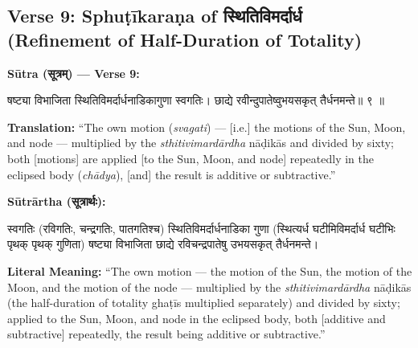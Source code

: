 \documentclass[11pt,a4paper]{article}
\newcommand{\dev}[1]{{\devanagarifont #1}}
\newenvironment{sanskritverse}{%
  \begin{center}\begin{minipage}{0.95\textwidth}
  \setlength{\leftskip}{1em}
  \setlength{\rightskip}{1em}
  \dev
}{\end{minipage}\end{center}}
\newenvironment{paracol}[1]{\begingroup}{\endgroup}
\newcommand{\switchcolumn}[1][]{%
  \ifnum#1=0\relax\else\par\nobreak\vspace{0.5em}\par\nobreak\fi%
}
\begin{document}
\subsection{Verse 9: Sphuṭīkaraṇa of \texorpdfstring{{\devanagarifont स्थितिविमर्दार्ध}}{sthitivimardārdha} (Refinement of Half-Duration of Totality)}

\vspace{0.5em}
\noindent\textbf{Sūtra (\dev{सूत्रम्}) — Verse 9:}

\begin{paracol}{2}

\begin{sanskritverse}
षष्ट्या विभाजिता स्थितिविमर्दार्धनाडिकागुणा स्वगतिः।
छाद्ये रवीन्दुपातेष्वुभयसकृत् तैर्धनमन्ते॥ ९ ॥
\end{sanskritverse}

\switchcolumn

\textbf{Translation:} ``The own motion (\textit{svagati}) --- [i.e.] the motions of the Sun, Moon, and node --- multiplied by the \textit{sthitivimardārdha} nāḍikās and divided by sixty; both [motions] are applied [to the Sun, Moon, and node] repeatedly in the eclipsed body (\textit{chādya}), [and] the result is additive or subtractive.''

\end{paracol}

\vspace{0.5em}

\begin{paracol}{2}

\noindent\textbf{Sūtrārtha (\dev{सूत्रार्थः}):}
\begin{sanskritverse}
स्वगतिः (रविगतिः, चन्द्रगतिः, पातगतिश्च) स्थितिविमर्दार्धनाडिका गुणा
(स्थित्यर्ध घटीमिविमर्दार्ध घटीभिः पृथक् पृथक् गुणिता) षष्ट्या विभाजिता छाद्ये
रविचन्द्रपातेषु उभयसकृत् तैर्धनमन्ते।
\end{sanskritverse}

\switchcolumn

\textbf{Literal Meaning:} ``The own motion --- the motion of the Sun, the motion of the Moon, and the motion of the node --- multiplied by the \textit{sthitivimardārdha} nāḍikās (the half-duration of totality ghaṭīs multiplied separately) and divided by sixty; applied to the Sun, Moon, and node in the eclipsed body, both [additive and subtractive] repeatedly, the result being additive or subtractive.''

\end{paracol}
\end{document}

